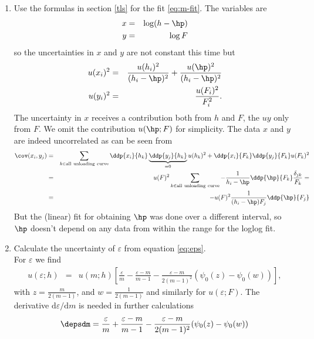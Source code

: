 \begin{enumerate}
 \item \label{op_unc_mxy}
 Use the formulas in section \ref{tls} for the fit \eqref{eq:m-fit}.
The variables are 
 \begin{eqnarray*}
  x &=& \log (h-\hp) \\
  y &=& \log F
 \end{eqnarray*}
so 
the uncertainties in $x$ and $y$ are not constant this time but
 \begin{eqnarray*}
u(x_i)^2 &=& \frac{u(h_i)^2}{(h_i-\hp)^2} + \frac{u(\hp)^2}{(h_i-\hp)^2}  \\
u(y_i)^2 &=& \frac{u(F_i)^2}{F_i^2}.
 \end{eqnarray*} 
  The uncertainty in $x$ receives a contribution both from $h$ and $F$, the $uy$ only from $F$. We omit the contribution $u(\hp;F)$ for simplicity.
The data $x$ and $y$ are indeed uncorrelated as can be seen from
\begin{eqnarray*}
 \cov(x_i, y_j) &=& \sum_{k \in \mathrm{all\ unloading\ curve}} \ddp{x_i}{h_k}\underbrace{ \ddp{y_j}{h_k}}_{=0} u(h_k)^2 + \ddp{x_i}{F_k} \ddp{y_j}{F_k} u(F_k)^2 \\
  &=& 	u(F)^2  \sum_{k \in \mathrm{all\ unloading\ curve}} -\frac1{h_i-\hp} \ddp{\hp}{F_k} \frac{\delta_{jk}}{F_k} = \\
  &=& - u(F)^2 \frac{1}{(h_i - \hp) F_j} \ddp{\hp}{F_j}
\end{eqnarray*}
But the (linear) fit for obtaining $\hp$ was done over a different interval, so $\hp$ doesn't depend on any data from within the range for the loglog fit.
 
 
 
 \item \label{op_unc_eps}
 Calculate the uncertainty of $\varepsilon$ from equation \eqref{eq:eps}.\\
For $\varepsilon$  we find
 \begin{eqnarray} \label{eq:ueps}
  u (\varepsilon ;h) &=& u(m;h) \left[ 
  \frac{\varepsilon}{m} - \frac{\varepsilon -m}{m -1}  - \frac{\varepsilon - m}{2(m-1)^2} (\psi_0(z)-\psi_0(w)) \right], 
 \end{eqnarray}
 with $z = \frac{m}{2(m-1)}$, and $w = \frac1{2(m-1)}$ 
 and similarly for $u(\varepsilon ; F)$. 
 The derivative $\mathrm{d} \varepsilon /\mathrm{d} m$ is needed in further calculations
 \begin{equation} \label{eq:depsdm}
  \depsdm = \frac{\varepsilon}{m} + \frac{\varepsilon -m}{m -1}  - \frac{\varepsilon - m}{2(m-1)^2} (\psi_0(z)-\psi_0(w)) 
 \end{equation}
 

\end{enumerate}
